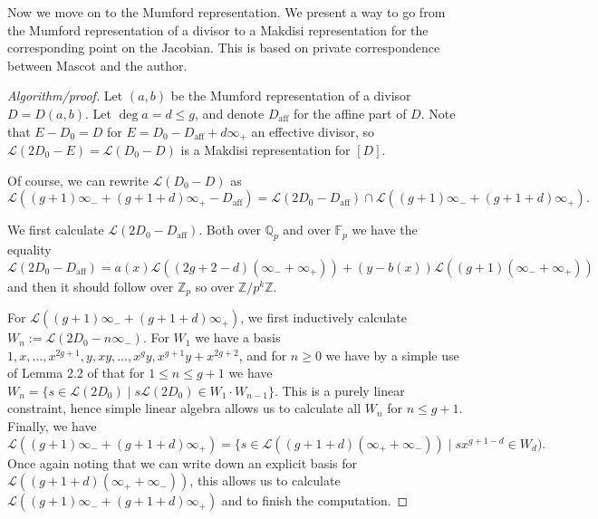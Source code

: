 \documentclass[12pt]{article}
\newcommand{\Z}{\mathbb{Z}}
\newcommand{\Q}{\mathbb{Q}}
\newcommand{\Lcal}{\mathcal{L}}
\newcommand{\F}{\mathbb{F}}
\theoremstyle{plain}
\theoremstyle{definition}
\theoremstyle{remark}
\begin{document}
Now we move on to the Mumford representation. We present a way to go from the Mumford representation of a divisor to a Makdisi representation for the corresponding point on the Jacobian. This is based on private correspondence between Mascot and the author.
\begin{proof}[Algorithm/proof]
Let $(a,b)$ be the Mumford representation of a divisor $D = D(a,b)$. Let $\deg a = d \leq g$, and denote $D_{\text{aff}}$ for the affine part of $D$. Note that $E-D_0 = D$ for $E = D_0 - D_{\text{aff}} + d\infty_+$ an effective divisor, so $\Lcal(2D_0 - E) = \Lcal(D_0 - D)$ is a Makdisi representation for $[D]$.

Of course, we can rewrite $\Lcal(D_0 -D)$ as 
\[
\Lcal((g+1)\infty_- + (g+1+d)\infty_+ - D_{\text{aff}}) = \Lcal(2D_0 - D_{\text{aff}} ) \cap \Lcal((g+1)\infty_- + (g+1+d)\infty_+).
\]

We first calculate $\Lcal(2D_0 - D_{\text{aff}})$. Both over $\Q_p$ and over $\F_p$ we have the equality
\[
\Lcal(2D_0 - D_{\text{aff}}) = a(x)\Lcal((2g+2-d)(\infty_- + \infty_+)) + (y-b(x))\Lcal((g+1)(\infty_- + \infty_+))
\]
and then it should follow over $\Z_p$ so over $\Z/p^k\Z$. 

For $\Lcal((g+1)\infty_- + (g+1+d)\infty_+)$, we first inductively calculate $W_n := \Lcal(2D_0 - n\infty_-)$. For $W_1$ we have a basis $1,x,\dots,x^{2g+1},y,xy,\dots,x^g y, x^{g+1}y+x^{2g+2}$, and for $n \geq 0$ we have by a simple use of Lemma 2.2 of \citep{makdisi04} that for $1 \leq n \leq g+1$ we have $W_{n} = \{s \in \Lcal(2D_0) \mid s\Lcal(2D_0) \in W_1 \cdot W_{n-1}\}$. This is a purely linear constraint, hence simple linear algebra allows us to calculate all $W_n$ for $n \leq g+1$. Finally, we have
\[
\Lcal((g+1)\infty_- + (g+1+d)\infty_+) = \{ s \in \Lcal((g+1+d)(\infty_+ + \infty_-)) \mid sx^{g+1-d} \in W_d).
\] 
Once again noting that we can write down an explicit basis for $\Lcal((g+1+d)(\infty_+ + \infty_-))$, this allows us to calculate $\Lcal((g+1)\infty_- + (g+1+d)\infty_+)$ and to finish the computation.
\end{proof}
\end{document}
